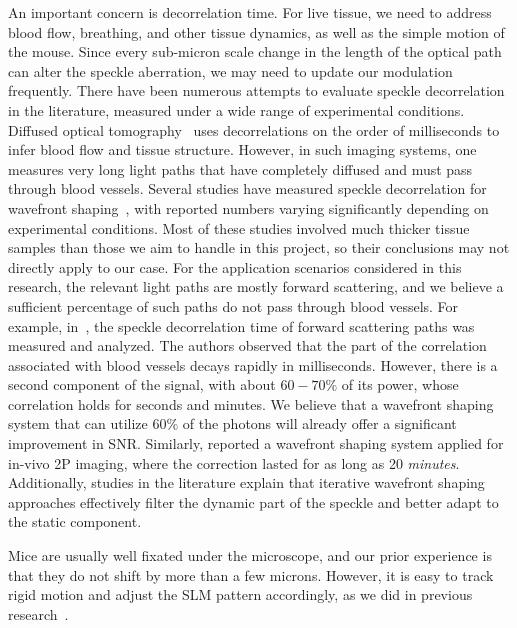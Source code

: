 An important concern is decorrelation time. For live tissue, we need to address blood flow, breathing, and other tissue dynamics, as well as the simple motion of the mouse. Since every sub-micron scale change in the length of the optical path can alter the speckle aberration, we may need to update our modulation frequently.
There have been numerous attempts to evaluate speckle decorrelation in the literature, measured under a wide range of experimental conditions. Diffused optical tomography~\cite{Durduran2010,berne2000dynamic,Boas:97,DynamicLightScattering} uses decorrelations on the order of milliseconds to infer blood flow and tissue structure. However, in such imaging systems, one measures very long light paths that have completely diffused and must pass through blood vessels.
Several studies have measured speckle decorrelation for wavefront shaping~\cite{Cui2010,Jang:15,Qureshi:17}, with reported numbers varying significantly depending on experimental conditions. Most of these studies involved much thicker tissue samples than those we aim to handle in this project, so their conclusions may not directly apply to our case.
For the application scenarios considered in this research, the relevant light paths are mostly forward scattering, and we believe a sufficient percentage of such paths do not pass through blood vessels. For example, in~\cite{Yang2020Fighting}, the speckle decorrelation time of forward scattering paths was measured and analyzed. The authors observed that the part of the correlation associated with blood vessels decays rapidly in milliseconds. However, there is a second component of the signal, with about $60-70\%$ of its power, whose correlation holds for seconds and minutes. We believe that a wavefront shaping system that can utilize $60\%$ of the photons will already offer a significant improvement in SNR.
Similarly,\cite{Papadopoulos16} reported a wavefront shaping system applied for in-vivo 2P imaging, where the correction lasted for as long as 20 {\em minutes}. Additionally, studies in the literature explain that iterative wavefront shaping approaches effectively filter the dynamic part of the speckle and better adapt to the static component\cite{GU1994353,Blochet:19}.

Mice are usually well fixated under the microscope, and our prior experience is that they do not shift by more than a few microns. However, it is easy to track rigid motion and adjust the SLM pattern accordingly, as we did in previous research~\cite{Pegard2016Compressive}.  



